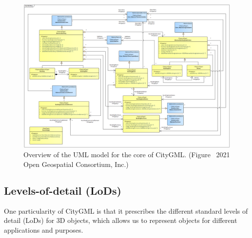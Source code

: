 \begin{figure}
  \centering
  \includegraphics[width=0.95\linewidth]{figs/citygml_uml_building}
  \caption{Overview of the UML model for the core of CityGML\@. (Figure \textcopyright\ 2021 Open Geospatial Consortium, Inc.)}%
\label{fig:citygml_uml_building}
\end{figure}



%

\subsection{Levels-of-detail (LoDs)} 

One particularity of CityGML is that it prescribes the different standard levels of detail (LoDs) for 3D objects, which allows us to represent objects for different applications and purposes.

